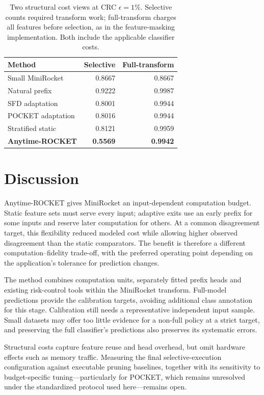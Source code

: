 \documentclass[pdflatex,sn-basic,Numbered]{sn-jnl}
\begin{document}
\begin{table}[htbp]
\centering\small
\caption{Two structural cost views at CRC $\epsilon=1\%$. Selective counts required transform work; full-transform charges all features before selection, as in the feature-masking implementation. Both include the applicable classifier costs.}\label{tab:execution}
\setlength{\tabcolsep}{4pt}
\begin{tabular}{|l|r|r|}
\hline\hline
\textbf{Method} & \textbf{Selective} & \textbf{Full-transform} \\
\hline
Small MiniRocket & 0.8667 & 0.8667 \\
\hline
Natural prefix & 0.9222 & 0.9987 \\
\hline
SFD adaptation & 0.8001 & 0.9944 \\
\hline
POCKET adaptation & 0.8016 & 0.9944 \\
\hline
Stratified static & 0.8121 & 0.9959 \\
\hline
\textbf{Anytime-ROCKET} & \textbf{0.5569} & \textbf{0.9942} \\
\hline
\hline\hline
\end{tabular}
\end{table}

\section{Discussion}\label{sec:discussion}
Anytime-ROCKET gives MiniRocket an input-dependent computation budget. Static feature sets must serve every input; adaptive exits use an early prefix for some inputs and reserve later computation for others. At a common disagreement target, this flexibility reduced modeled cost while allowing higher observed disagreement than the static comparators. The benefit is therefore a different computation--fidelity trade-off, with the preferred operating point depending on the application's tolerance for prediction changes.

The method combines computation units, separately fitted prefix heads and existing risk-control tools within the MiniRocket transform. Full-model predictions provide the calibration targets, avoiding additional class annotation for this stage. Calibration still needs a representative independent input sample. Small datasets may offer too little evidence for a non-full policy at a strict target, and preserving the full classifier's predictions also preserves its systematic errors.

Structural costs capture feature reuse and head overhead, but omit hardware effects such as memory traffic. Measuring the final selective-execution configuration against executable pruning baselines, together with its sensitivity to budget-specific tuning---particularly for POCKET, which remains unresolved under the standardized protocol used here---remains open.
\end{document}
